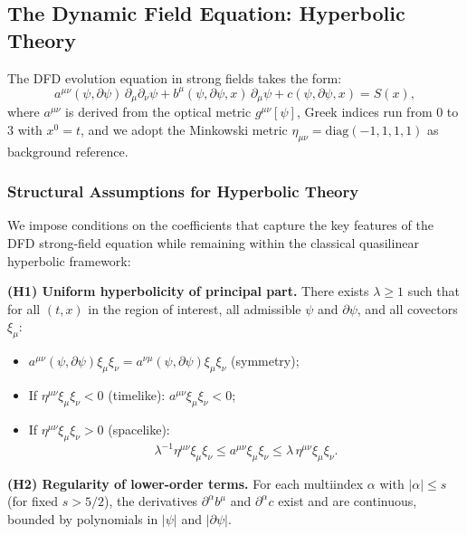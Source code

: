 \subsection{The Dynamic Field Equation: Hyperbolic Theory}\label{app:well-dynamic}

The DFD evolution equation in strong fields takes the form:
\begin{equation}\label{eq:dynamic-pde-U}
a^{\mu\nu}(\psi, \partial\psi)\,\partial_\mu\partial_\nu\psi 
+ b^\mu(\psi, \partial\psi, x)\,\partial_\mu\psi 
+ c(\psi, \partial\psi, x) = S(x),
\end{equation}
where $a^{\mu\nu}$ is derived from the optical metric $g^{\mu\nu}[\psi]$, 
Greek indices run from 0 to 3 with $x^0 = t$, and we adopt the Minkowski 
metric $\eta_{\mu\nu} = \mathrm{diag}(-1,1,1,1)$ as background reference.

\subsubsection{Structural Assumptions for Hyperbolic Theory}

We impose conditions on the coefficients that capture the key features of the 
DFD strong-field equation while remaining within the classical quasilinear 
hyperbolic framework:

\medskip
\noindent\textbf{(H1) Uniform hyperbolicity of principal part.}
There exists $\lambda \geq 1$ such that for all $(t,x)$ in the region of 
interest, all admissible $\psi$ and $\partial\psi$, and all covectors $\xi_\mu$:
\begin{itemize}
\item $a^{\mu\nu}(\psi,\partial\psi)\xi_\mu\xi_\nu = a^{\nu\mu}(\psi,\partial\psi)\xi_\mu\xi_\nu$ (symmetry);
\item If $\eta^{\mu\nu}\xi_\mu\xi_\nu < 0$ (timelike): $a^{\mu\nu}\xi_\mu\xi_\nu < 0$;
\item If $\eta^{\mu\nu}\xi_\mu\xi_\nu > 0$ (spacelike):
\begin{equation}
\lambda^{-1}\eta^{\mu\nu}\xi_\mu\xi_\nu \leq a^{\mu\nu}\xi_\mu\xi_\nu 
\leq \lambda\,\eta^{\mu\nu}\xi_\mu\xi_\nu.
\end{equation}
\end{itemize}

\medskip
\noindent\textbf{(H2) Regularity of lower-order terms.}
For each multiindex $\alpha$ with $|\alpha| \leq s$ (for fixed $s > 5/2$), 
the derivatives $\partial^\alpha b^\mu$ and $\partial^\alpha c$ exist and 
are continuous, bounded by polynomials in $|\psi|$ and $|\partial\psi|$.

